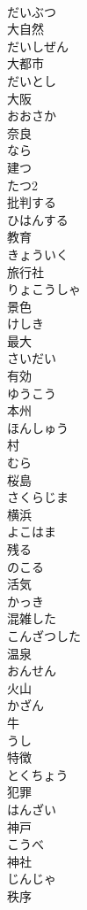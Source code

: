 \documentclass[8pt]{extreport}
\begin{document}
\begin{CJK}{UTF8}{min}
\\	だいぶつ
\\	大自然	
\\	だいしぜん
\\	大都市	
\\	だいとし
\\	大阪	
\\	おおさか
\\	奈良	
\\	なら
\\	建つ	
\\	たつ2
\\	批判する	
\\	ひはんする
\\	教育	
\\	きょういく
\\	旅行社	
\\	りょこうしゃ
\\	景色	
\\	けしき
\\	最大	
\\	さいだい
\\	有効	
\\	ゆうこう
\\	本州	
\\	ほんしゅう
\\	村	
\\	むら
\\	桜島	
\\	さくらじま
\\	横浜	
\\	よこはま
\\	残る	
\\	のこる
\\	活気	
\\	かっき
\\	混雑した	
\\	こんざつした
\\	温泉	
\\	おんせん
\\	火山	
\\	かざん
\\	牛	
\\	うし
\\	特徴	
\\	とくちょう
\\	犯罪	
\\	はんざい
\\	神戸	
\\	こうべ
\\	神社	
\\	じんじゃ
\\	秩序	

\end{CJK}
\end{document}
